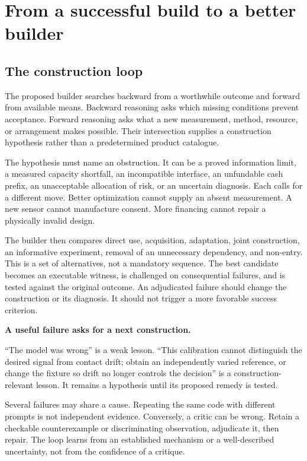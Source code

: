 \section{From a successful build to a better builder}
\label{sec:builder}

\subsection{The construction loop}

The proposed builder searches backward from a worthwhile outcome and forward from available means. Backward reasoning asks which missing conditions prevent acceptance. Forward reasoning asks what a new measurement, method, resource, or arrangement makes possible. Their intersection supplies a construction hypothesis rather than a predetermined product catalogue.

The hypothesis must name an obstruction. It can be a proved information limit, a measured capacity shortfall, an incompatible interface, an unfundable cash prefix, an unacceptable allocation of risk, or an uncertain diagnosis. Each calls for a different move. Better optimization cannot supply an absent measurement. A new sensor cannot manufacture consent. More financing cannot repair a physically invalid design.

The builder then compares direct use, acquisition, adaptation, joint construction, an informative experiment, removal of an unnecessary dependency, and non-entry. This is a set of alternatives, not a mandatory sequence. The best candidate becomes an executable witness, is challenged on consequential failures, and is tested against the original outcome. An adjudicated failure should change the construction or its diagnosis. It should not trigger a more favorable success criterion.

\begin{practicebox}
\textbf{A useful failure asks for a next construction.}\par
``The model was wrong'' is a weak lesson. ``This calibration cannot distinguish the desired signal from contact drift; obtain an independently varied reference, or change the fixture so drift no longer controls the decision'' is a construction-relevant lesson. It remains a hypothesis until its proposed remedy is tested.
\end{practicebox}

Several failures may share a cause. Repeating the same code with different prompts is not independent evidence. Conversely, a critic can be wrong. Retain a checkable counterexample or discriminating observation, adjudicate it, then repair. The loop learns from an established mechanism or a well-described uncertainty, not from the confidence of a critique.

